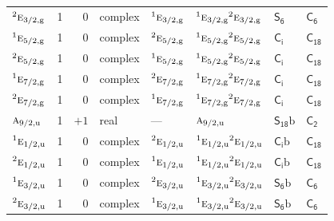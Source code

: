 \documentclass[10pt,a4paper]{article}
\numberwithin{equation}{section}
\newcommand{\grp}[1]{\mathsf{#1}}
\newcommand{\irr}[1]{\text{\normalfont\scshape #1}}
\newcommand{\conjpair}[1]{{}^{#1}}
\newcommand{\ptag}[1]{\mathrm{#1}}
\newcommand{\secondclass}{\mathrm{b}}
\begin{document}
{\begin{longtable}{@{}lrrlllll@{}}
$\conjpair{2}\irr{e}_{3/2,\ptag{g}}$ & 1 & $0$ & complex & $\conjpair{1}\irr{e}_{3/2,\ptag{g}}$ & $\conjpair{1}\irr{e}_{3/2,\ptag{g}}\conjpair{2}\irr{e}_{3/2,\ptag{g}}$ & \href{S6.pdf}{$\grp{S_{6}}$} & \href{../../../rotation/data/pdf/C6.pdf}{$\grp{C_{6}}$}\\
$\conjpair{1}\irr{e}_{5/2,\ptag{g}}$ & 1 & $0$ & complex & $\conjpair{2}\irr{e}_{5/2,\ptag{g}}$ & $\conjpair{1}\irr{e}_{5/2,\ptag{g}}\conjpair{2}\irr{e}_{5/2,\ptag{g}}$ & \href{S2.pdf}{$\grp{C_{i}}$} & $\grp{C_{18}}$\\
$\conjpair{2}\irr{e}_{5/2,\ptag{g}}$ & 1 & $0$ & complex & $\conjpair{1}\irr{e}_{5/2,\ptag{g}}$ & $\conjpair{1}\irr{e}_{5/2,\ptag{g}}\conjpair{2}\irr{e}_{5/2,\ptag{g}}$ & \href{S2.pdf}{$\grp{C_{i}}$} & $\grp{C_{18}}$\\
$\conjpair{1}\irr{e}_{7/2,\ptag{g}}$ & 1 & $0$ & complex & $\conjpair{2}\irr{e}_{7/2,\ptag{g}}$ & $\conjpair{1}\irr{e}_{7/2,\ptag{g}}\conjpair{2}\irr{e}_{7/2,\ptag{g}}$ & \href{S2.pdf}{$\grp{C_{i}}$} & $\grp{C_{18}}$\\
$\conjpair{2}\irr{e}_{7/2,\ptag{g}}$ & 1 & $0$ & complex & $\conjpair{1}\irr{e}_{7/2,\ptag{g}}$ & $\conjpair{1}\irr{e}_{7/2,\ptag{g}}\conjpair{2}\irr{e}_{7/2,\ptag{g}}$ & \href{S2.pdf}{$\grp{C_{i}}$} & $\grp{C_{18}}$\\
$\irr{a}_{9/2,\ptag{u}}$ & 1 & $+1$ & real & --- & $\irr{a}_{9/2,\ptag{u}}$ & \href{S18b.pdf}{$\grp{S_{18}}\secondclass$} & \href{../../../rotation/data/pdf/C2.pdf}{$\grp{C_{2}}$}\\
$\conjpair{1}\irr{e}_{1/2,\ptag{u}}$ & 1 & $0$ & complex & $\conjpair{2}\irr{e}_{1/2,\ptag{u}}$ & $\conjpair{1}\irr{e}_{1/2,\ptag{u}}\conjpair{2}\irr{e}_{1/2,\ptag{u}}$ & \href{S2b.pdf}{$\grp{C_{i}}\secondclass$} & $\grp{C_{18}}$\\
$\conjpair{2}\irr{e}_{1/2,\ptag{u}}$ & 1 & $0$ & complex & $\conjpair{1}\irr{e}_{1/2,\ptag{u}}$ & $\conjpair{1}\irr{e}_{1/2,\ptag{u}}\conjpair{2}\irr{e}_{1/2,\ptag{u}}$ & \href{S2b.pdf}{$\grp{C_{i}}\secondclass$} & $\grp{C_{18}}$\\
$\conjpair{1}\irr{e}_{3/2,\ptag{u}}$ & 1 & $0$ & complex & $\conjpair{2}\irr{e}_{3/2,\ptag{u}}$ & $\conjpair{1}\irr{e}_{3/2,\ptag{u}}\conjpair{2}\irr{e}_{3/2,\ptag{u}}$ & \href{S6b.pdf}{$\grp{S_{6}}\secondclass$} & \href{../../../rotation/data/pdf/C6.pdf}{$\grp{C_{6}}$}\\
$\conjpair{2}\irr{e}_{3/2,\ptag{u}}$ & 1 & $0$ & complex & $\conjpair{1}\irr{e}_{3/2,\ptag{u}}$ & $\conjpair{1}\irr{e}_{3/2,\ptag{u}}\conjpair{2}\irr{e}_{3/2,\ptag{u}}$ & \href{S6b.pdf}{$\grp{S_{6}}\secondclass$} & \href{../../../rotation/data/pdf/C6.pdf}{$\grp{C_{6}}$}\\

\end{longtable}}
\end{document}
